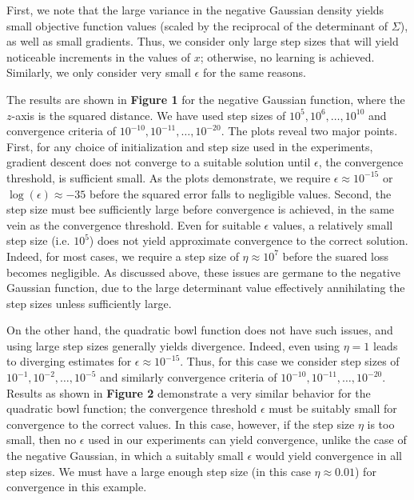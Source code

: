 \documentclass[10pt,psamsfonts]{amsart}
\theoremstyle{definition}
\theoremstyle{remark}
\numberwithin{equation}{section}
\begin{document}
First, we note that the large variance in the negative Gaussian density yields small objective function values (scaled by the reciprocal of the determinant of $\Sigma$), as well as small gradients. Thus, we consider only large step sizes that will yield noticeable increments in the values of $x$; otherwise, no learning is achieved. Similarly, we only consider very small $\epsilon$ for the same reasons.

The results are shown in {\bf Figure 1} for the negative Gaussian function, where the $z$-axis is the squared distance. We have used step sizes of $10^5, 10^6, \dots, 10^10$ and convergence criteria of $10^{-10}, 10^{-11}, \dots, 10^{-20}$. The plots reveal two major points. First, for any choice of initialization and step size used in the experiments, gradient descent does not converge to a suitable solution until $\epsilon$, the convergence threshold, is sufficient small. As the plots demonstrate, we require $\epsilon \approx 10^{-15}$ or $\log(\epsilon) \approx -35$ before the squared error falls to negligible values. Second, the step size must bee sufficiently large before convergence is achieved, in the same vein as the convergence threshold. Even for suitable $\epsilon$ values, a relatively small step size (i.e. $10^5$) does not yield approximate convergence to the correct solution. Indeed, for most cases, we require a step size of $\eta \approx 10^7$ before the suared loss becomes negligible. As discussed above, these issues are germane to the negative Gaussian function, due to the large determinant value effectively annihilating the step sizes unless sufficiently large.

On the other hand, the quadratic bowl function does not have such issues, and using large step sizes generally yields divergence. Indeed, even using $\eta = 1$ leads to diverging estimates for $\epsilon \approx 10^{-15}$. Thus, for this case we consider step sizes of $10^{-1}, 10^{-2}, \dots, 10^{-5}$ and similarly convergence criteria of $10^{-10}, 10^{-11}, \dots, 10^{-20}$. Results as shown in {\bf Figure 2} demonstrate a very similar behavior for the quadratic bowl function; the convergence threshold $\epsilon$ must be suitably small for convergence to the correct values. In this case, however, if the step size $\eta$ is too small, then no $\epsilon$ used in our experiments can yield convergence, unlike the case of the negative Gaussian, in which a suitably small $\epsilon$ would yield convergence in all step sizes. We must have a large enough step size (in this case $\eta \approx 0.01$) for convergence in this example.
\end{document}

